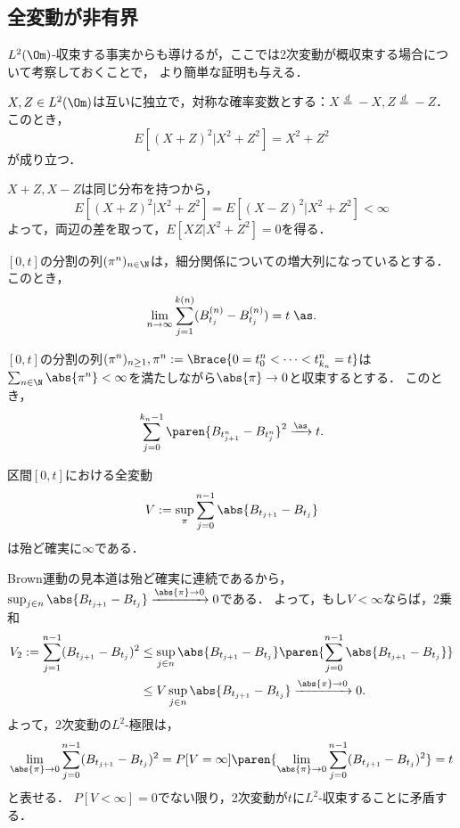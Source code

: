 \documentclass[uplatex,dvipdfmx]{jsreport}
\begin{document}
\subsection{全変動が非有界}

\begin{tcolorbox}[colframe=ForestGreen, colback=ForestGreen!10!white,breakable,colbacktitle=ForestGreen!40!white,coltitle=black,fonttitle=\bfseries\sffamily,
title=]
    $L^2(\Om)$-収束する事実からも導けるが，ここでは2次変動が概収束する場合について考察しておくことで，
    より簡単な証明も与える．
\end{tcolorbox}

\begin{lemma}
    $X,Z\in L^2(\Om)$は互いに独立で，対称な確率変数とする：$X\overset{d}{=}-X,Z\overset{d}{=}-Z$．
    このとき，
    \[E[(X+Z)^2|X^2+Z^2]=X^2+Z^2\]
    が成り立つ．
\end{lemma}
\begin{Proof}
    $X+Z,X-Z$は同じ分布を持つから，
    \[E[(X+Z)^2|X^2+Z^2]=E[(X-Z)^2|X^2+Z^2]<\infty\]
    よって，両辺の差を取って，$E[XZ|X^2+Z^2]=0$を得る．
\end{Proof}

\begin{proposition}[2次変動の概収束部分列]
    $[0,t]$の分割の列$(\pi^n)_{n\in\N}$は，細分関係についての増大列になっているとする．
    このとき，
    \[\lim_{n\to\infty}\sum^{k(n)}_{j=1}(B_{t_j}^{(n)}-B_{t_j}^{(n)})=t\;\as.\]
\end{proposition}

\begin{proposition}[2次変動が概収束するための十分条件]
    $[0,t]$の分割の列$(\pi^n)_{n\ge 1},\pi^n:=\Brace{0=t^n_0<\cdots<t^n_{k_n}=t}$は$\sum_{n\in\N}\abs{\pi^n}<\infty$を満たしながら$\abs{\pi}\to0$と収束するとする．
    このとき，
    \[\sum^{k_n-1}_{j=0}\paren{B_{t^n_{j+1}}-B_{t^n_j}}^2\xrightarrow{\as}t.\]
\end{proposition}

\begin{corollary}[全変動の発散]
    区間$[0,t]$における全変動
    \[V:=\sup_{\pi}\sum^{n-1}_{j=0}\abs{B_{t_{j+1}}-B_{t_j}}\]
    は殆ど確実に$\infty$である．
\end{corollary}
\begin{Proof}
    Brown運動の見本道は殆ど確実に連続であるから，$\sup_{j\in n}\abs{B_{t_{j+1}}-B_{t_j}}\xrightarrow{\abs{\pi}\to0}0$である．
    よって，もし$V<\infty$ならば，2乗和
    \begin{align*}
        V_2:=\sum^{n-1}_{j=1}(B_{t_{j+1}}-B_{t_j})^2&\le\sup_{j\in n}\abs{B_{t_{j+1}}-B_{t_j}}\paren{\sum^{n-1}_{j=0}\abs{B_{t_{j+1}}-B_{t_j}}}\\
        &\le V\sup_{j\in n}\abs{B_{t_{j+1}}-B_{t_j}}\xrightarrow{\abs{\pi}\to0}0.
    \end{align*}
    よって，2次変動の$L^2$-極限は，
    \[\lim_{\abs{\pi}\to0}\sum^{n-1}_{j=0}(B_{t_{j+1}}-B_{t_j})^2=P[V=\infty]\paren{\lim_{\abs{\pi}\to0}\sum^{n-1}_{j=0}(B_{t_{j+1}}-B_{t_j})^2}=t\]
    と表せる．
    $P[V<\infty]=0$でない限り，2次変動が$t$に$L^2$-収束することに矛盾する．
\end{Proof}
\end{document}
